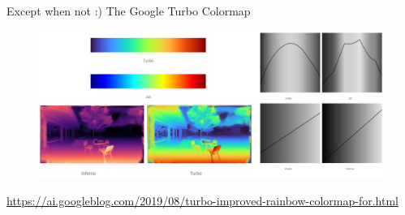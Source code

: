 \documentclass[aspectratio=169]{../latex_main/tntbeamer}  %
\begin{document}
	
	
	\begin{frame}{Except when not :) The Google Turbo Colormap}
	    \begin{figure}
	        \centering
	        \includegraphics[scale=.35]{Bild64}
	    \end{figure}
	    \url{https://ai.googleblog.com/2019/08/turbo-improved-rainbow-colormap-for.html }
	\end{frame}
	
\end{document}
